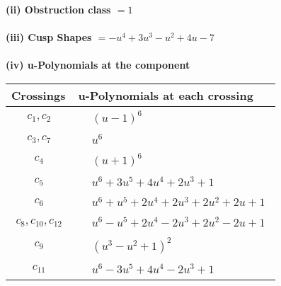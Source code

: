 \documentclass[1p]{elsarticle_modified}
\theoremstyle{definition}
\begin{document}
\flushleft \textbf{(ii) Obstruction class $= 1$}\\~\\
\flushleft \textbf{(iii) Cusp Shapes $= - u^4+3 u^3- u^2+4 u-7$}\\~\\
\newpage\renewcommand{\arraystretch}{1}
\flushleft \textbf{(iv) u-Polynomials at the component}\newline \\
\begin{tabular}{m{50pt}|m{274pt}}
Crossings & \hspace{64pt}u-Polynomials at each crossing \\
\hline $$\begin{aligned}c_{1},c_{2}\end{aligned}$$&$\begin{aligned}
&(u-1)^6
\end{aligned}$\\
\hline $$\begin{aligned}c_{3},c_{7}\end{aligned}$$&$\begin{aligned}
&u^6
\end{aligned}$\\
\hline $$\begin{aligned}c_{4}\end{aligned}$$&$\begin{aligned}
&(u+1)^6
\end{aligned}$\\
\hline $$\begin{aligned}c_{5}\end{aligned}$$&$\begin{aligned}
&u^6+3 u^5+4 u^4+2 u^3+1
\end{aligned}$\\
\hline $$\begin{aligned}c_{6}\end{aligned}$$&$\begin{aligned}
&u^6+u^5+2 u^4+2 u^3+2 u^2+2 u+1
\end{aligned}$\\
\hline $$\begin{aligned}c_{8},c_{10},c_{12}\end{aligned}$$&$\begin{aligned}
&u^6- u^5+2 u^4-2 u^3+2 u^2-2 u+1
\end{aligned}$\\
\hline $$\begin{aligned}c_{9}\end{aligned}$$&$\begin{aligned}
&(u^3- u^2+1)^2
\end{aligned}$\\
\hline $$\begin{aligned}c_{11}\end{aligned}$$&$\begin{aligned}
&u^6-3 u^5+4 u^4-2 u^3+1
\end{aligned}$\\
\hline
\end{tabular}\\~\\
\end{document}
